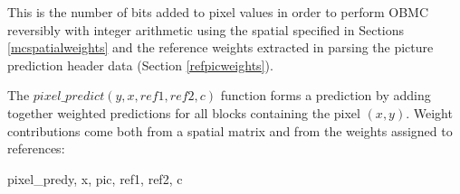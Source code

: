 This is the number of bits added to pixel values in order to perform OBMC 
reversibly with integer arithmetic using the spatial specified in Sections 
\ref{mcspatialweights} and the reference weights extracted in
parsing the picture prediction header data (Section \ref{refpicweights}).

The $pixel\_predict(y, x, ref1, ref2, c)$ function forms a prediction by adding together weighted predictions
for all blocks containing the pixel $(x,y)$. Weight contributions come both from a spatial matrix and from the
weights assigned to references:

\begin{pseudo}{pixel\_pred}{y, x, pic, ref1, ref2, c}
   \bsELSE
    \bsEND{}
\bsEND
{}
\end{pseudo}


